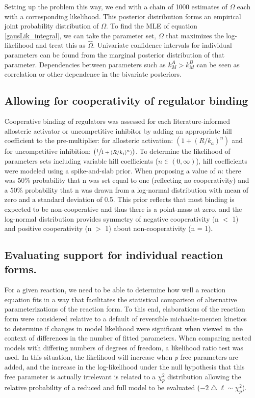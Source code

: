 Setting up the problem this way, we end with a chain of 1000 estimates of $\Omega$ each with a corresponding likelihood.  This posterior distribution forms an empirical joint probability distribution of $\Omega$.  To find the MLE of equation \ref{gausLik_integral}, we can take the parameter set, $\Omega$ that maximizes the log-likelihood and treat this as $\hat{\Omega}$.   Univariate confidence intervals for individual parameters can be found from the marginal posterior distribution of that parameter.  Dependencies between parameters such as $k^{A}_{M} > k^{B}_{M}$ can be seen as correlation or other dependence in the bivariate posteriors.\\

\subsection{Allowing for cooperativity of regulator binding}

Cooperative binding of regulators was assessed for each literature-informed allosteric activator or uncompetitive inhibitor by adding an appropriate hill coefficient to the pre-multiplier: for allosteric activation: $(1 + (R/k_{a})^n)$ and for uncompetitive inhibition: $(\sfrac{1}{1 + (R/k_{i})^n)})$.  To determine the likelihood of parameters sets including variable hill coefficients ($n \in (0,\infty)$), hill coefficients were modeled using a spike-and-slab prior.  When proposing a value of $n$: there was 50\% probability that n was set equal to one (reflecting no cooperativity) and a 50\% probability that n was drawn from a log-normal distribution with mean of zero and a standard deviation of 0.5.  This prior reflects that most binding is expected to be non-cooperative and thus there is a point-mass at zero, and the log-normal distribution provides symmetry of negative cooperativity (n $<$ 1) and positive cooperativity (n $>$ 1) about non-cooperativity (n = 1).

\subsection{Evaluating support for individual reaction forms.}

For a given reaction, we need to be able to determine how well a reaction equation fits in a way that facilitates the statistical comparison of alternative parameterizations of the reaction form.  To this end, elaborations of the reaction form were considered relative to a default of reversible michaelis-menten kinetics to determine if changes in model likelihood were significant when viewed in the context of differences in the number of fitted parameters.  When comparing nested models with differing numbers of degrees of freedom, a likelihood ratio test was used.  In this situation, the likelihood will increase when \textit{p} free parameters are added, and the increase in the log-likelihood under the null hypothesis that this free parameter is actually irrelevant is related to a $\chi^{2}_{p}$ distribution allowing the relative probability of a reduced and full model to be evaluated ($-2\bigtriangleup\ell \sim \chi^{2}_{p}$).

